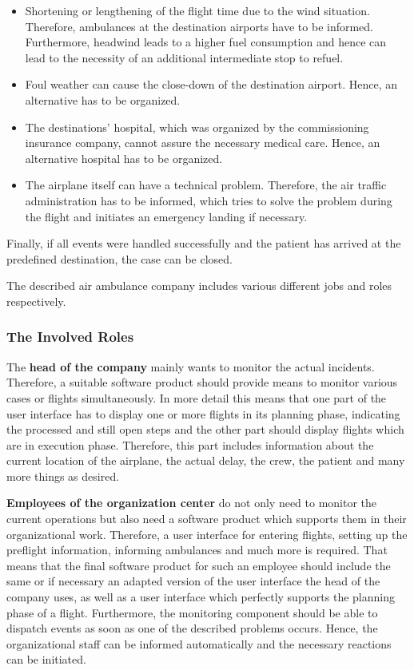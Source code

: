 \begin{itemize}
  \item Shortening or lengthening of the flight time due to the wind situation. Therefore,
  ambulances at the destination airports have to be informed. Furthermore, headwind leads to a
  higher fuel consumption and hence can lead to the necessity of an additional intermediate stop to
  refuel.
  \item Foul weather can cause the close-down of the destination airport. Hence, an alternative has
  to be organized.
  \item The destinations' hospital, which was organized by the commissioning insurance company,
  cannot assure the necessary medical care. Hence, an alternative hospital has to be organized.
  \item The airplane itself can have a technical problem. Therefore, the air traffic administration
  has to be informed, which tries to solve the problem during the flight and initiates an emergency
  landing if necessary.
\end{itemize}

Finally, if all events were handled successfully and the patient has arrived at the predefined
destination, the case can be closed.

The described air ambulance company includes various different jobs and roles respectively.

\subsubsection{The Involved Roles}

The \textbf{head of the company} mainly wants to monitor the actual incidents. Therefore, a suitable
software product should provide means to monitor various cases or flights simultaneously. In more
detail this means that one part of the user interface has to display one or more flights in its
planning phase, indicating the processed and still open steps and the other part should display
flights which are in execution phase. Therefore, this part includes information about the current location of the
airplane, the actual delay, the crew, the patient and many more things as desired.

\textbf{Employees of the organization center} do not only need to monitor the current operations
but also need a software product which supports them in their organizational work. Therefore, a
user interface for entering flights, setting up the preflight information, informing ambulances and
much more is required.\newline
That means that the final software product for such an employee should include the same or if
necessary an adapted version of the user interface the head of the company uses, as well as a user
interface which perfectly supports the planning phase of a flight. Furthermore, the monitoring
component should be able to dispatch events as soon as one of the described problems occurs. Hence,
the organizational staff can be informed automatically and the necessary reactions can be initiated.

